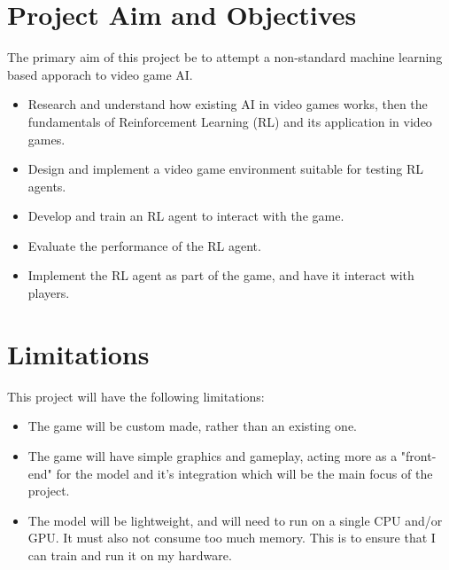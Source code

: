 \section{Project Aim and Objectives}
The primary aim of this project be to attempt a non-standard machine learning based apporach to video game AI.
\begin{itemize} 
    \item Research and understand how existing AI in video games works, then the fundamentals of Reinforcement Learning (RL) and its application in video games.
    \item Design and implement a video game environment suitable for testing RL agents.
    \item Develop and train an RL agent to interact with the game.
    \item Evaluate the performance of the RL agent.
    \item Implement the RL agent as part of the game, and have it interact with players.
\end{itemize}

\section{Limitations}
This project will have the following limitations:
\begin{itemize} 
    \item The game will be custom made, rather than an existing one.
    \item The game will have simple graphics and gameplay, acting more as a "front-end" for the model and it's integration which will be the main focus of the project.
    \item The model will be lightweight, and will need to run on a single CPU and/or GPU. It must also not consume too much memory. This is to ensure that I can train and run it on my hardware.
\end{itemize}
